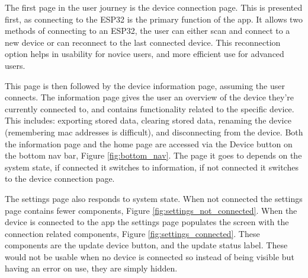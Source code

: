 \documentclass{l4proj}
\begin{document}
The first page in the user journey is the device connection page. This is presented first, as connecting to the ESP32 is the primary function of the app. It allows two methods of connecting to an ESP32, the user can either scan and connect to a new device or can reconnect to the last connected device. This reconnection option helps in usability for novice users, and more efficient use for advanced users.

This page is then followed by the device information page, assuming the user connects. The information page gives the user an overview of the device they're currently connected to, and contains functionality related to the specific device. This includes: exporting stored data, clearing stored data, renaming the device (remembering mac addresses is difficult), and disconnecting from the device. Both the information page and the home page are accessed via the Device button on the bottom nav bar, Figure \ref{fig:bottom_nav}. The page it goes to depends on the system state, if connected it switches to information, if not connected it switches to the device connection page.

The settings page also responds to system state. When not connected the settings page contains fewer components, Figure \ref{fig:settings_not_connected}. When the device is connected to the app the settings page populates the screen with the connection related components, Figure \ref{fig:settings_connected}. These components are the update device button, and the update status label. These would not be usable when no device is connected so instead of being visible but having an error on use, they are simply hidden.
\end{document}
